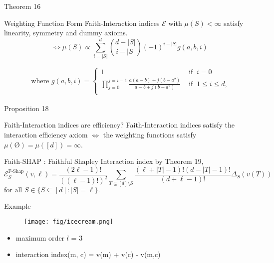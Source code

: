 \documentclass[10pt]{beamer}
\newcommand{\f}{v}
\def\Expl{\mathcal{E}}
\begin{document}
\begin{frame}{Theorem 16}
    \begin{mytheorembox}{Weighting Function Form}
        Faith-Interaction indices $\Expl$ with $\mu(S) < \infty$ satisfy linearity, symmetry and dummy axioms.
        \vspace{1em}
        \[ \iff
        \mu(S) \propto \sum_{i=|S|}^{d} \binom{d- |S|}{i-|S|}(-1)^{i-|S|} g(a,b,i) 
        \]

    \end{mytheorembox}
    \begin{align*}
        \text{ where }
        g(a,b,i) =
        \begin{cases}
            1 & \text{ if } \ i = 0 \\
            \prod_{j=0}^{j=i-1} \frac{a(a-b) + j(b-a^2)}{a-b + j(b-a^2)}
            & \text{ if } \   1 \leq i \leq d,\\
        \end{cases}
    \end{align*}
\end{frame}
\begin{frame}{Proposition 18}
    \begin{myaxiombox}{Faith-Interaction indices are efficiency?}
        Faith-Interaction indices satisfy the interaction efficiency axiom $\iff$
        the weighting functions satisfy $\mu(\text{\O}) = \mu([d]) = \infty$.
    \end{myaxiombox}
\end{frame}
\begin{frame}{Faith-SHAP : Faithful Shapley Interaction index}
    by Theorem 19,
    \begin{equation*}
    \label{eqn:faith_shapley_highest_order}
    \Expl_S^{\text{F-Shap}}(\f,\ell) = \frac{(2\ell -1)!}{((\ell-1)!)^2}
    \sum_{T \subseteq [d] \setminus S}\frac{(\ell+|T|-1)!(d-|T|-1)!}{(d+\ell-1)!}   \Delta_S(\f(T))
    \ \ 
    \end{equation*}
    $\text{for all } S \in \{ S \subseteq [d] : |S| = \ell \}.$
\end{frame}
\begin{frame}{Example}
    \begin{figure}
    \centering
    \texttt{[image: fig/icecream.png]}
    \end{figure}
    \begin{itemize}[label=\scalebox{0.5}{$\blacksquare$}]
        \item maximum order $l$ = 3
        \item interaction index(m, c) = v(m) + v(c) - v(m,c)
    \end{itemize}
    
\end{frame}
\begin{frame}
    
\end{frame}
\begin{frame}
    
\end{frame}
\begin{frame}
    
\end{frame}



\end{document}
